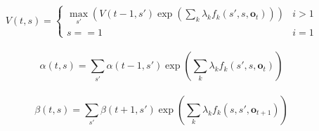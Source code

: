 \documentclass[11pt]{article}
\begin{document}
\begin{equation}
V(t, s) = \left\{ \begin{array}{lc}
\max_{s'}( V(t-1, s') \exp \left( \sum_k \lambda_k f_k(s', s, \mathbf{o}_t) \right) ) & i>1 \\
s==1 & i=1
\end{array} \right.
\end{equation}
\\

\begin{equation}
    \alpha(t, s) = \sum_{s'} \alpha(t-1, s') \exp \left( \sum_k \lambda_k f_k(s', s, \mathbf{o}_t) \right) 
\end{equation}
\\

\begin{equation}
    \beta(t, s) = \sum_{s'} \beta(t+1, s') \exp \left( \sum_k \lambda_k f_k(s, s', \mathbf{o}_{t+1}) \right)
\end{equation}
\\
\end{document}
